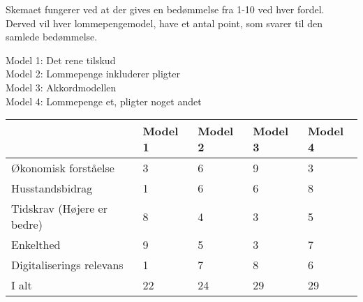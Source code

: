 Skemaet fungerer ved at der gives en bedømmelse fra 1-10 ved hver fordel. Derved vil hver lommepengemodel, have et antal point, som svarer til den samlede bedømmelse.

\noindent Model 1: Det rene tilskud\\
Model 2: Lommepenge inkluderer pligter\\
Model 3: Akkordmodellen\\
Model 4: Lommepenge et, pligter noget andet\\

\begin{center}
   \begin{tabular}{| l | l | l | l | l |} 
   \hline
   & Model 1 & Model 2 & Model 3 & Model 4 \\ \hline
   Økonomisk forståelse & 3 & 6 & 9 & 3 \\ \hline
   Husstandsbidrag & 1 & 6 & 6 & 8 \\ \hline
   Tidskrav (Højere er bedre) & 8 & 4 & 3 & 5 \\ \hline
   Enkelthed & 9 & 5 & 3 & 7 \\ \hline
   Digitaliserings relevans & 1 & 7 & 8 & 6 \\ \hline
   I alt & 22 & 24 & 29 & 29 \\ \hline
   \hline
   \end{tabular}
\end{center}
